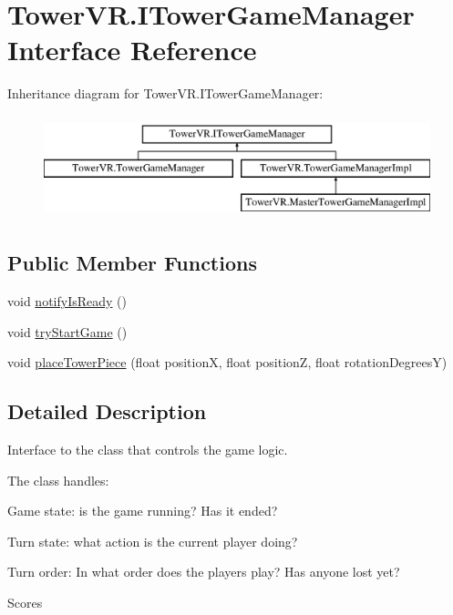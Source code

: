 \hypertarget{interface_tower_v_r_1_1_i_tower_game_manager}{}\section{Tower\+V\+R.\+I\+Tower\+Game\+Manager Interface Reference}
\label{interface_tower_v_r_1_1_i_tower_game_manager}
Inheritance diagram for Tower\+V\+R.\+I\+Tower\+Game\+Manager\+:\begin{figure}[H]
\begin{center}
\leavevmode
\includegraphics[height=3.000000cm]{interface_tower_v_r_1_1_i_tower_game_manager}
\end{center}
\end{figure}
\subsection*{Public Member Functions}
\begin{DoxyCompactItemize}
\item 
void \hyperlink{interface_tower_v_r_1_1_i_tower_game_manager_a3091c61e8ef71c592a8baf1e611489c0}{notify\+Is\+Ready} ()
\item 
void \hyperlink{interface_tower_v_r_1_1_i_tower_game_manager_a3b5866dd2b9659d65982f4ff651ee2c9}{try\+Start\+Game} ()
\item 
void \hyperlink{interface_tower_v_r_1_1_i_tower_game_manager_aa800aded89d5de4af84321110f6eadd0}{place\+Tower\+Piece} (float positionX, float positionZ, float rotation\+DegreesY)
\end{DoxyCompactItemize}


\subsection{Detailed Description}
Interface to the class that controls the game logic.

The class handles\+:
\begin{DoxyItemize}
\item Game state\+: is the game running? Has it ended?
\item Turn state\+: what action is the current player doing?
\item Turn order\+: In what order does the players play? Has anyone lost yet?
\item Scores
\end{DoxyItemize}

